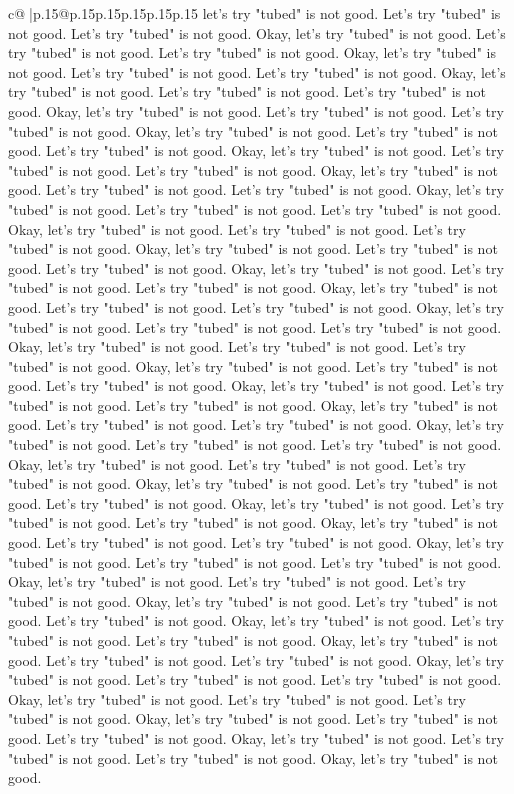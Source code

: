 \documentclass{article}
\begin{document}
{\begin{supertabular}{c@{$\;$}|p{.15\linewidth}@{}p{.15\linewidth}p{.15\linewidth}p{.15\linewidth}p{.15\linewidth}p{.15\linewidth}}
{{{let's try "tubed" is not good. Let's try "tubed" is not good. Let's try "tubed" is not good. Okay, let's try "tubed" is not good. Let's try "tubed" is not good. Let's try "tubed" is not good. Okay, let's try "tubed" is not good. Let's try "tubed" is not good. Let's try "tubed" is not good. Okay, let's try "tubed" is not good. Let's try "tubed" is not good. Let's try "tubed" is not good. Okay, let's try "tubed" is not good. Let's try "tubed" is not good. Let's try "tubed" is not good. Okay, let's try "tubed" is not good. Let's try "tubed" is not good. Let's try "tubed" is not good. Okay, let's try "tubed" is not good. Let's try "tubed" is not good. Let's try "tubed" is not good. Okay, let's try "tubed" is not good. Let's try "tubed" is not good. Let's try "tubed" is not good. Okay, let's try "tubed" is not good. Let's try "tubed" is not good. Let's try "tubed" is not good. Okay, let's try "tubed" is not good. Let's try "tubed" is not good. Let's try "tubed" is not good. Okay, let's try "tubed" is not good. Let's try "tubed" is not good. Let's try "tubed" is not good. Okay, let's try "tubed" is not good. Let's try "tubed" is not good. Let's try "tubed" is not good. Okay, let's try "tubed" is not good. Let's try "tubed" is not good. Let's try "tubed" is not good. Okay, let's try "tubed" is not good. Let's try "tubed" is not good. Let's try "tubed" is not good. Okay, let's try "tubed" is not good. Let's try "tubed" is not good. Let's try "tubed" is not good. Okay, let's try "tubed" is not good. Let's try "tubed" is not good. Let's try "tubed" is not good. Okay, let's try "tubed" is not good. Let's try "tubed" is not good. Let's try "tubed" is not good. Okay, let's try "tubed" is not good. Let's try "tubed" is not good. Let's try "tubed" is not good. Okay, let's try "tubed" is not good. Let's try "tubed" is not good. Let's try "tubed" is not good. Okay, let's try "tubed" is not good. Let's try "tubed" is not good. Let's try "tubed" is not good. Okay, let's try "tubed" is not good. Let's try "tubed" is not good. Let's try "tubed" is not good. Okay, let's try "tubed" is not good. Let's try "tubed" is not good. Let's try "tubed" is not good. Okay, let's try "tubed" is not good. Let's try "tubed" is not good. Let's try "tubed" is not good. Okay, let's try "tubed" is not good. Let's try "tubed" is not good. Let's try "tubed" is not good. Okay, let's try "tubed" is not good. Let's try "tubed" is not good. Let's try "tubed" is not good. Okay, let's try "tubed" is not good. Let's try "tubed" is not good. Let's try "tubed" is not good. Okay, let's try "tubed" is not good. Let's try "tubed" is not good. Let's try "tubed" is not good. Okay, let's try "tubed" is not good. Let's try "tubed" is not good. Let's try "tubed" is not good. Okay, let's try "tubed" is not good. Let's try "tubed" is not good. Let's try "tubed" is not good. Okay, let's try "tubed" is not good. Let's try "tubed" is not good. Let's try "tubed" is not good. Okay, let's try "tubed" is not good. Let's try "tubed" is not good. Let's try "tubed" is not good. Okay, let's try "tubed" is not good. Let's try "tubed" is not good. Let's try "tubed" is not good. Okay, let's try "tubed" is not good. }}}
\end{supertabular}}
\end{document}
